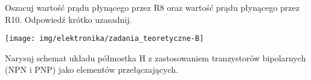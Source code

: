 % 
% 
% 
% 





%
%

\dbEntryCheckResults
Oszacuj wartość prądu płynącego przez R8 oraz wartość prądu płynącego przez R10. Odpowiedź krótko uzasadnij.
	\begin{center}
		\texttt{[image: img/elektronika/zadania\_teoretyczne-B]}
	\end{center}
\fi

\dbEntryCheckResults
Narysuj schemat układu półmostka H z zastosowaniem tranzystorów bipolarnych (NPN i PNP) jako elementów przełączających.
\fi


%
%

